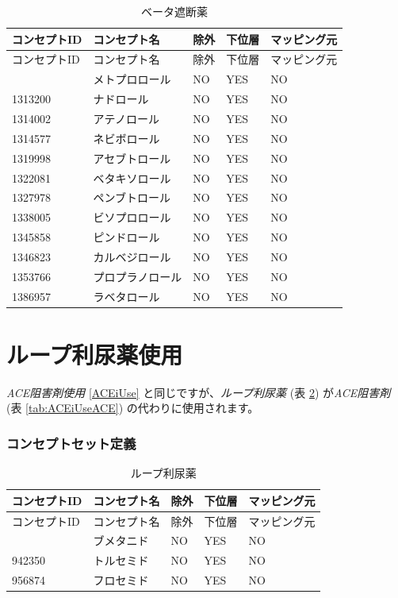 \documentclass[
  11pt]{book}
\theoremstyle{definition}
\theoremstyle{definition}
\theoremstyle{definition}
\theoremstyle{definition}
\theoremstyle{remark}
\begin{document}
\begin{longtable}[]{@{}lllll@{}}
\caption{\label{tab:BBUseBB} ベータ遮断薬}\tabularnewline
\toprule\noalign{}
コンセプトID & コンセプト名 & 除外 & 下位層 & マッピング元 \\
\midrule\noalign{}
\endfirsthead
\toprule\noalign{}
コンセプトID & コンセプト名 & 除外 & 下位層 & マッピング元 \\
\midrule\noalign{}
\endhead
\bottomrule\noalign{}
\endlastfoot
1307046 & メトプロロール & NO & YES & NO \\
1313200 & ナドロール & NO & YES & NO \\
1314002 & アテノロール & NO & YES & NO \\
1314577 & ネビボロール & NO & YES & NO \\
1319998 & アセブトロール & NO & YES & NO \\
1322081 & ベタキソロール & NO & YES & NO \\
1327978 & ペンブトロール & NO & YES & NO \\
1338005 & ビソプロロール & NO & YES & NO \\
1345858 & ピンドロール & NO & YES & NO \\
1346823 & カルベジロール & NO & YES & NO \\
1353766 & プロプラノロール & NO & YES & NO \\
1386957 & ラベタロール & NO & YES & NO \\
\end{longtable}

\section{ループ利尿薬使用}\label{DLoopUse}

\emph{ACE阻害剤使用} \ref{ACEiUse} と同じですが、\emph{ループ利尿薬} (表 \ref{tab:DLoopUseDLoops}) が\emph{ACE阻害剤} (表 \ref{tab:ACEiUseACE}) の代わりに使用されます。

\subsubsection*{コンセプトセット定義}\label{ux30b3ux30f3ux30bbux30d7ux30c8ux30bbux30c3ux30c8ux5b9aux7fa9-12}

\begin{longtable}[]{@{}lllll@{}}
\caption{\label{tab:DLoopUseDLoops} ループ利尿薬}\tabularnewline
\toprule\noalign{}
コンセプトID & コンセプト名 & 除外 & 下位層 & マッピング元 \\
\midrule\noalign{}
\endfirsthead
\toprule\noalign{}
コンセプトID & コンセプト名 & 除外 & 下位層 & マッピング元 \\
\midrule\noalign{}
\endhead
\bottomrule\noalign{}
\endlastfoot
932745 & ブメタニド & NO & YES & NO \\
942350 & トルセミド & NO & YES & NO \\
956874 & フロセミド & NO & YES & NO \\
\end{longtable}
\end{document}
